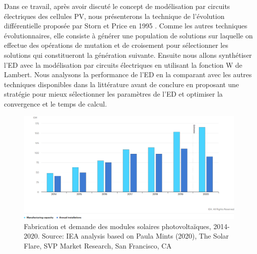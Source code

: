 Dans ce travail, après avoir discuté le concept de modélisation par circuits électriques des cellules PV, nous présenterons la technique de l'évolution différentielle proposée par Storn et Price en 1995 \cite{Storn1995}. Comme les autres techniques évolutionnaires, elle consiste à générer une population de solutions sur laquelle on effectue des opérations de mutation et de croisement pour sélectionner les solutions qui constitueront la génération suivante. Ensuite nous allons synthétiser l'ED avec la modélisation par circuits électriques en utilisant la fonction W de Lambert. Nous analysons la performance de l'ED en la comparant avec les autres techniques disponibles dans la littérature avant de conclure en proposant une stratégie pour mieux sélectionner les paramètres de l'ED et optimiser la convergence et le temps de calcul.
\begin{figure}
  \begin{center}
    \includegraphics[width=\textwidth]{resources/ieapv.png}
    \caption{Fabrication et demande des modules solaires photovoltaïques, 2014-2020. Source: IEA analysis based on Paula Mints (2020), The Solar Flare, SVP Market Research, San Francisco, CA \cite{iea2020}}
    \label{fig:ieapv}
  \end{center}
\end{figure}
